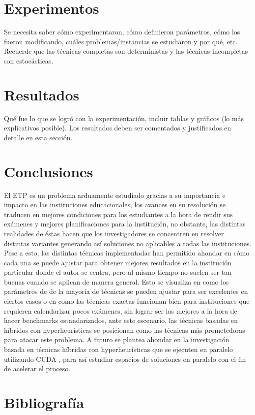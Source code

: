 \documentclass[letter, 10pt]{article}
\begin{document}
\section{Experimentos}
Se necesita saber c\'omo experimentaron, c\'omo definieron par\'ametros, 
c\'omo los fueron modificando, cu\'ales problemas/instancias se estudiaron y por qu\'e, etc. 
Recuerde que las t\'ecnicas completas son deterministas y las t\'ecnicas incompletas son estoc\'asticas.

\section{Resultados}
Qu\'e fue lo que se logr\'o con la experimentaci\'on, incluir tablas y gr\'aficos (lo m\'as explicativos posible).
Los resultados deben ser comentados y justificados en detalle en esta secci\'on.


\section{Conclusiones} \label{conclusiones}

El ETP es un problema arduamente estudiado gracias a su importancia e impacto en las instituciones educacionales, los avances en su resolución se traducen en mejores condiciones para los estudiantes a la hora de rendir sus exámenes y mejores planificaciones para la institución, no obstante, las distintas realidades de éstas hacen que los investigadores se concentren en resolver distintas variantes generando así soluciones no aplicables a todas las instituciones. Pese a esto, las distintas técnicas implementadas han permitido ahondar en cómo cada una se puede ajustar para obtener mejores resultados en la institución particular donde el autor se centra, pero al mismo tiempo no suelen ser tan buenas cuando se aplican de manera general. Esto se visualiza en como los parámetros de de la mayoría de técnicas se pueden ajustar para ser excelentes en ciertos casos o en como las técnicas exactas funcionan bien para instituciones que requieren calendarizar pocos exámenes, sin lograr ser las mejores a la hora de hacer benchmarks estandarizados, ante este escenario, las técnicas basadas en híbridos con hyperheurísticas se posicionan como las técnicas más prometedoras para atacar este problema. A futuro se plantea ahondar en la investigación basada en técnicas híbridas con hyperheurísticas que se ejecuten en paralelo utilizando CUDA \cite{cuda}, para así estudiar espacios de soluciones en paralelo con el fin de acelerar el proceso.


\section*{Bibliografía}


\end{document}
